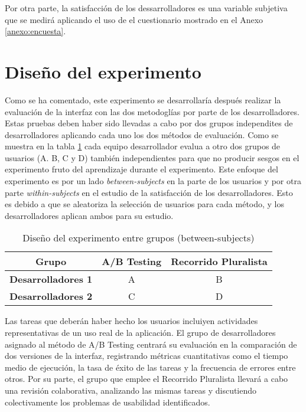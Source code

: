 \documentclass[a4paper,12pt]{report}
\begin{document}
Por otra parte, la satisfacción de los dessarrolladores es una variable subjetiva que se medirá aplicando el uso de el cuestionario mostrado en el Anexo \ref{anexo:encuesta}. 

\section{Diseño del experimento}
Como se ha comentado, este experimento se desarrollaría después realizar la evaluación de la interfaz con las dos metodoglías por parte de los desarrolladores. Estas pruebas deben haber sido llevadas a cabo por dos grupos independites de desarrolladores aplicando cada uno los dos métodos de evaluación. Como se muestra en la tabla \ref{tab:diseño_experimento} cada equipo desarrollador evalua a otro dos grupos de usuarios (A. B, C y D) también independientes para que no producir sesgos en el experimento fruto del aprendizaje durante el experimento. Este enfoque del experimento es por un lado \textit{between-subjects} en la parte de los usuarios y por otra parte \textit{within-subjects} en el estudio de la satisfacción de los desarrolladores. Esto es debido a que se aleatoriza la selección de usuarios para cada método, y los desarrolladores aplican ambos para su estudio. 

\begin{table}[h]
\centering
\begin{tabular}{|c|c|c|}
\hline
\textbf{Grupo} & \textbf{A/B Testing} & \textbf{Recorrido Pluralista} \\ \hline
\textbf{Desarrolladores 1} & A & B \\ \hline
\textbf{Desarrolladores 2} & C & D \\ \hline
\end{tabular}
\caption{Diseño del experimento entre grupos (between-subjects)}
\label{tab:diseño_experimento}
\end{table}

Las tareas que deberán haber hecho los usuarios incluiyen actividades representativas de un uso real de la aplicación. El grupo de desarrolladores asignado al método de A/B Testing centrará su evaluación en la comparación de dos versiones de la interfaz, registrando métricas cuantitativas como el tiempo medio de ejecución, la tasa de éxito de las tareas y la frecuencia de errores entre otros. Por su parte, el grupo que emplee el Recorrido Pluralista llevará a cabo una revisión colaborativa, analizando las mismas tareas y discutiendo colectivamente los problemas de usabilidad identificados.
\end{document}

